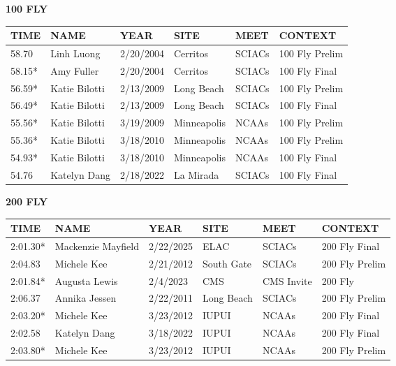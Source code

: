 \vspace{0.4cm}

\begin{minipage}[t]{0.48\textwidth}
\centering
\textbf{100 FLY}\\[0.05cm]
\begin{tabular}{@{}p{1.8cm}p{2.8cm}p{1.2cm}p{1.4cm}p{1.4cm}p{2.0cm}@{}}
\hline
\textbf{TIME} & \textbf{NAME} & \textbf{YEAR} & \textbf{SITE} & \textbf{MEET} & \textbf{CONTEXT} \\
\hline
58.70 & Linh Luong & 2/20/2004 & Cerritos & SCIACs & 100 Fly Prelim \\
58.15* & Amy Fuller & 2/20/2004 & Cerritos & SCIACs & 100 Fly Final \\
56.59* & Katie Bilotti & 2/13/2009 & Long Beach & SCIACs & 100 Fly Prelim \\
56.49* & Katie Bilotti & 2/13/2009 & Long Beach & SCIACs & 100 Fly Final \\
55.56* & Katie Bilotti & 3/19/2009 & Minneapolis & NCAAs & 100 Fly Prelim \\
55.36* & Katie Bilotti & 3/18/2010 & Minneapolis & NCAAs & 100 Fly Prelim \\
54.93* & Katie Bilotti & 3/18/2010 & Minneapolis & NCAAs & 100 Fly Final \\
54.76 & Katelyn Dang & 2/18/2022 & La Mirada & SCIACs & 100 Fly Final \\
\hline
\end{tabular}
\end{minipage}\hfill
\begin{minipage}[t]{0.48\textwidth}
\centering
\textbf{200 FLY}\\[0.05cm]
\begin{tabular}{@{}p{1.8cm}p{2.8cm}p{1.2cm}p{1.4cm}p{1.4cm}p{2.0cm}@{}}
\hline
\textbf{TIME} & \textbf{NAME} & \textbf{YEAR} & \textbf{SITE} & \textbf{MEET} & \textbf{CONTEXT} \\
\hline
2:01.30* & Mackenzie Mayfield & 2/22/2025 & ELAC & SCIACs & 200 Fly Final \\
2:04.83 & Michele Kee & 2/21/2012 & South Gate & SCIACs & 200 Fly Prelim \\
2:01.84* & Augusta Lewis & 2/4/2023 & CMS & CMS Invite & 200 Fly \\
2:06.37 & Annika Jessen & 2/22/2011 & Long Beach & SCIACs & 200 Fly Prelim \\
2:03.20* & Michele Kee & 3/23/2012 & IUPUI & NCAAs & 200 Fly Final \\
2:02.58 & Katelyn Dang & 3/18/2022 & IUPUI & NCAAs & 200 Fly Final \\
2:03.80* & Michele Kee & 3/23/2012 & IUPUI & NCAAs & 200 Fly Prelim \\
\hline
\end{tabular}
\end{minipage}

